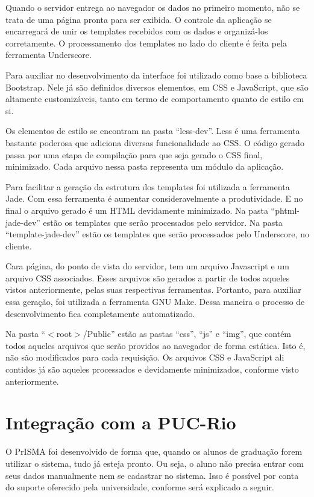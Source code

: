 \documentclass[graduacao,brazil]{ThesisPUC}
\begin{document}
Quando o servidor entrega ao navegador os dados no primeiro momento, não se trata de uma página pronta para ser exibida. O controle da aplicação se encarregará de unir os templates recebidos com os dados e organizá-los corretamente. O processamento dos templates no lado do cliente é feita pela ferramenta Underscore\cite{Underscore}.

Para auxiliar no desenvolvimento da interface foi utilizado como base a biblioteca Bootstrap\cite{Bootstrap}. Nele já são definidos diversos elementos, em CSS e JavaScript, que são altamente customizáveis, tanto em termo de comportamento quanto de estilo em si.

Os elementos de estilo se encontram na pasta “less-dev”. Less\cite{Less} é uma ferramenta bastante poderosa que adiciona diversas funcionalidade ao CSS. O código gerado passa por uma etapa de compilação para que seja gerado o CSS final, minimizado. Cada arquivo nessa pasta representa um módulo da aplicação.

Para facilitar a geração da estrutura dos templates foi utilizada a ferramenta Jade\cite{Jade}. Com essa ferramenta é aumentar consideravelmente a produtividade. E no final o arquivo gerado é um HTML devidamente minimizado. Na pasta “phtml-jade-dev” estão os templates que serão processados pelo servidor. Na pasta “template-jade-dev” estão os templates que serão processados pelo Underscore\cite{Underscore}, no cliente.

Cara página, do ponto de vista do servidor, tem um arquivo Javascript e um arquivo CSS associados. Esses arquivos são gerados a partir de todos aqueles vistos anteriormente, pelas suas respectivas ferramentas. Portanto, para auxiliar essa geração, foi utilizada a ferramenta GNU Make. Dessa maneira o processo de desenvolvimento fica completamente automatizado.

Na pasta “$<$root$>$/Public” estão as pastas “css”, “js” e “img”, que contém todos aqueles arquivos que serão providos ao navegador de forma estática. Isto é, não são modificados para cada requisição. Os arquivos CSS e JavaScript ali contidos já são aqueles processados e devidamente minimizados, conforme visto anteriormente.

\section{Integração com a PUC-Rio}

O PrISMA foi desenvolvido de forma que, quando os alunos de graduação forem utilizar o sistema, tudo já esteja pronto. Ou seja, o aluno não precisa entrar com seus dados manualmente nem se cadastrar no sistema. Isso é possível por conta do suporte oferecido pela universidade, conforme será explicado a seguir.
\end{document}

